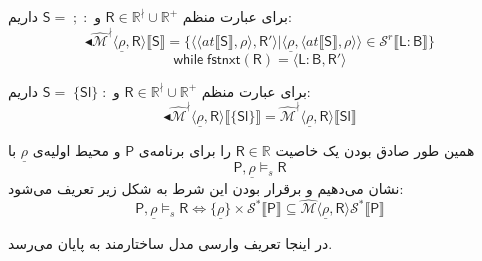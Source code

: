 برای عبارت منظم 
$\mathsf{R} \in \mathbb{R}^\nmid \cup \mathbb{R^+}$
و 
$\mathsf{S= \; ; \;:}$
داریم:
$$\blacktriangleleft\mathcal{\hat{M}^\nmid}  \langle \underline{\rho}, \mathsf{R} \rangle \llbracket \mathsf{S} \rrbracket = \{\langle \langle at \llbracket \mathsf{S} \rrbracket , \rho \rangle , \mathsf{R'} \rangle | \langle \underline{\rho}, \langle at \llbracket \mathsf{S} \rrbracket , \rho \rangle \rangle \in \mathcal{S}^r \llbracket \mathsf{L:B}\rrbracket\}$$
$$\mathsf{while \; fstnxt (R) = \langle L:B,R' \rangle}$$
	
	

برای عبارت منظم 
$\mathsf{R} \in \mathbb{R}^\nmid \cup \mathbb{R^+}$
و 
$\mathsf{S= \; \{Sl\} \;:}$
داریم:
$$\blacktriangleleft \mathcal{\hat{M}^\nmid} \langle \underline{\rho}, \mathsf{R} \rangle \llbracket \{\mathsf{Sl}\} \rrbracket =
 \mathcal{\hat{M}^\nmid} \langle \underline{\rho}, \mathsf{R} \rangle \llbracket \mathsf{Sl} \rrbracket$$


همین طور صادق بودن یک خاصیت $\mathsf{R} \in \mathbb{R}$ را برای برنامه‌ی $\mathsf{P}$ و محیط اولیه‌ی $\underline{\rho}$ با 
$$\mathsf{P} , \underline{\rho} \models_s \mathsf{R}$$
نشان می‌دهیم و برقرار بودن این شرط به شکل زیر تعریف می‌شود:
$$\mathsf{P} , \underline{\rho} \models_s \mathsf{R} \iff \{\underline{\rho}\} \times \mathcal{S}^* \llbracket \mathsf{P} \rrbracket \subseteq \hat{\mathcal{M}} \langle \underline{\rho} , \mathsf{R} \rangle \mathcal{S}^* \llbracket \mathsf{P} \rrbracket$$



در اینجا تعریف وارسی مدل ساختارمند به پایان می‌رسد.
 
 
 
 
 
 
 
 
 
 